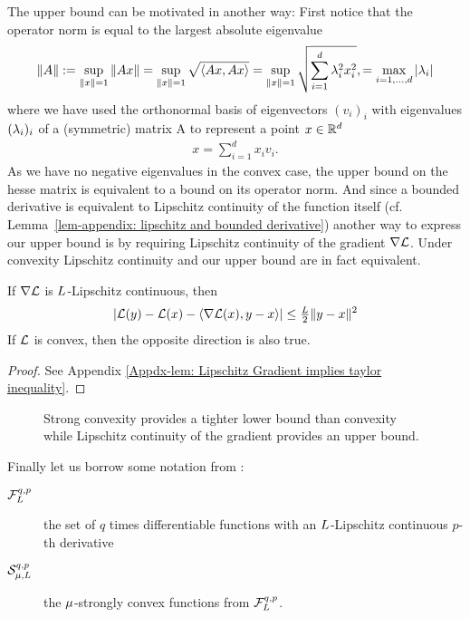 The upper bound can be motivated in another way: First notice that
the operator norm is equal to the largest absolute eigenvalue
\begin{align*}
	\|A\| := \sup_{\|x\| =1} \|Ax\|
	= \sup_{\|x\| =1} \sqrt{\langle Ax, Ax\rangle}
	= \sup_{\|x\| =1} \sqrt{\sum_{i=1}^\dimension \hesseEV_i^2 x_i^2},
	= \max_{i=1,\dots,\dimension} |\hesseEV_i|
\end{align*}
where we have used the orthonormal basis of eigenvectors \((v_i)_i\) with
eigenvalues \((\hesseEV_i)_i\) of a (symmetric) matrix A to represent a point
\(x\in\reals^\dimension\)
\begin{align*}
	x = \sum_{i=1}^{d}x_i v_i.
\end{align*}
As we have no negative eigenvalues in the convex case, the upper bound on the
hesse matrix is equivalent to a bound on its operator norm. And since a
bounded derivative is equivalent to Lipschitz continuity of the function itself
(cf. Lemma~\ref{lem-appendix: lipschitz and bounded derivative}) another way
to express our upper bound is by requiring Lipschitz continuity of the gradient
\(\nabla \Loss\). Under convexity Lipschitz continuity and our upper bound are
in fact equivalent.
%
\begin{lemma}
	\label{lem: Lipschitz Gradient implies taylor inequality}
	If \(\nabla \Loss\) is \(\ubound\)-Lipschitz continuous, then
	\begin{align*}
		| \Loss(y) - \Loss(x) - \langle \nabla \Loss(x), y-x\rangle |
		\le \tfrac{\ubound}2 \|y-x\|^2
	\end{align*}
	If \(\Loss\) is convex, then the opposite direction is also true.
\end{lemma}
\begin{proof}
	See Appendix \ref{Appdx-lem: Lipschitz Gradient implies taylor inequality}.
\end{proof}
%
\begin{figure}[h]
	\centering
	\def\svgwidth{1\textwidth}
	
	\caption{Strong convexity provides a tighter lower bound than convexity
	while Lipschitz continuity of the gradient provides an upper bound.}
	\label{fig: visualize strong convexity}
\end{figure}
%
\begin{definition}
	Finally let us borrow some notation from \citeauthor{nesterovLecturesConvexOptimization2018}:
	\begin{description}
		\item[{\(\lipGradientSet[q,p]{\ubound}\)}] the set of \(q\) times differentiable functions with an
		\(\ubound\)-Lipschitz continuous \(p\)-th derivative
		\item[{\(\strongConvex[q,p]{\lbound}{\ubound}\)}] the \(\lbound\)-strongly convex
		functions from \(\lipGradientSet[q,p]{\ubound}\).
	\end{description}
\end{definition}

